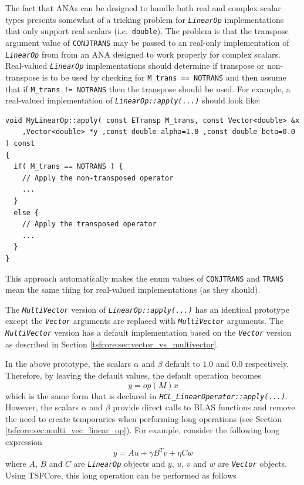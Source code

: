 The fact that ANAs can be designed to handle both real and complex
scalar types presents somewhat of a tricking problem for
{}\texttt{\textit{Linear\-Op}} implementations that only support real
scalars (i.e.~{}\texttt{double}).  The problem is that the transpose
argument value of {}\texttt{CONJTRANS} may be passed to an real-only
implementation of {}\texttt{\textit{Linear\-Op}} from from an ANA
designed to work properly for complex scalars.  Real-valued
{}\texttt{\textit{Linear\-Op}} implementations should determine if
transpose or non-transpose is to be used by checking for
{}\texttt{M\_trans == NOTRANS} and then assume that if
{}\texttt{M\_trans != NOTRANS} then the transpose should be used.  For
example, a real-valued implementation of
{}\texttt{\textit{LinearOp\-::apply(\-...)}} should look like:

{\scriptsize\begin{verbatim}
void MyLinearOp::apply( const ETransp M_trans, const Vector<double> &x
    ,Vector<double> *y ,const double alpha=1.0 ,const double beta=0.0 ) const
{
  if( M_trans == NOTRANS ) {
    // Apply the non-transposed operator
    ...
  }
  else {
    // Apply the transposed operator
    ...
  }
}
\end{verbatim}}



This approach automatically makes the enum values of
{}\texttt{CONJTRANS} and {}\texttt{TRANS} mean the same thing for
real-valued implementations (as they should).

The {}\texttt{\textit{Multi\-Vector}} version of
{}\texttt{\textit{LinearOp\-::apply(\-...)}} has an identical
prototype except the {}\texttt{\textit{Vector}} arguments are replaced
with {}\texttt{\textit{Multi\-Vector}} arguments.  The
{}\texttt{\textit{Multi\-Vector}} version has a default implementation
based on the {}\texttt{\textit{Vector}} version as described in
Section {}\ref{tsfcore:sec:vector_vs_multivector}.

In the above prototype, the scalars $\alpha$ and $\beta$ default to
$1.0$ and $0.0$ respectively.  Therefore, by leaving the default
values, the default operation becomes
%
\[
y = op(M) x
\]
%
which is the same form that is declared in
{}\texttt{\textit{HCL\-\_Linear\-Operator\-::apply(\-...)}}.  However,
the scalars $\alpha$ and $\beta$ provide direct calls to BLAS
functions and remove the need to create temporaries when performing
long operations (see Section {}\ref{tsfcore:sec:multi_vec_linear_op}).
For example, consider the following long expression
%
\[
y = A u + \gamma B^T v + \eta C w
\]
%
where $A$, $B$ and $C$ are {}\texttt{\textit{LinearOp}} objects and
$y$, $u$, $v$ and $w$ are {}\texttt{\textit{Vector}} objects.  Using
TSFCore, this long operation can be performed as follows

